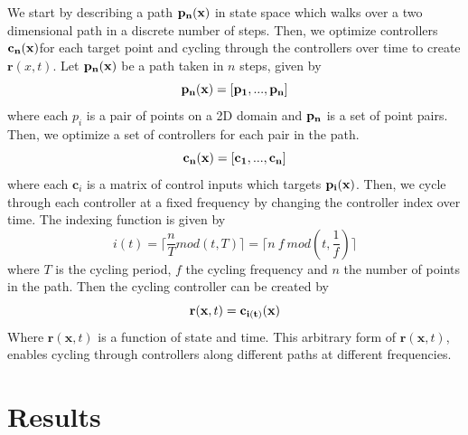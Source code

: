 \documentclass[12pt]{iopart}
\begin{document}
 We start by describing a path $\bf{p}_n(x)$ in state space which walks over a two dimensional path in a discrete number of steps.
  Then, we optimize controllers $\bf{c}_n(x)$for each target point and cycling through the controllers over time to create $\mathbf{r}(x,t)$.
Let  $\bf{p}_n(x)$ be a path taken in $n$ steps, given by
\begin{equation}
\bf{p}_n(x)=[p_1,...,p_n]
\end{equation}
where each $p_i$ is a pair of points on a 2D domain and $\bf{p}_n$ is a set of point pairs. Then, we optimize a set of controllers for each pair in the path.
\begin{equation}
\bf{c}_n(x)=[c_1,...,c_n]
\end{equation}
where each $\mathbf{c}_i$ is a matrix of control inputs which targets $\bf{p}_i(x)$.
Then, we cycle through each controller at a fixed frequency by changing the controller index over time. The indexing function is given by 
\begin{equation}
i(t)=\lceil \frac{n}{T} mod(t,T)\rceil = \lceil n \ f \ mod(t,\frac{1}{f})\rceil
\end{equation}
where $T$ is the cycling period, $f$ the cycling frequency and $n$ the number of points in the path. Then the cycling controller can be created by 
 \begin{equation}
\mathbf{r}(\mathbf{x},t)=\bf{c}_{i(t)}(x)
\end{equation}
Where $\mathbf{r}(\mathbf{x},t)$ is a function of state and time. This arbitrary form of $\mathbf{r}(\mathbf{x},t)$, enables cycling through controllers along different paths at different frequencies.


\section{Results}

\end{document}

